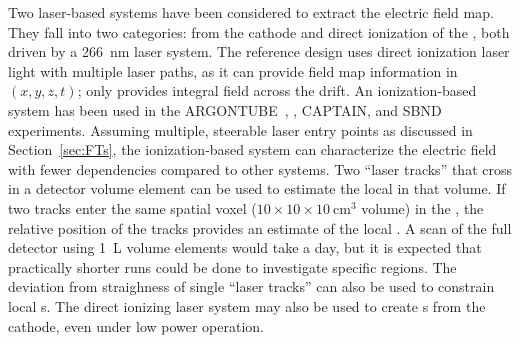 

Two laser-based systems have been considered to extract the electric field map. They fall into two categories: \phel from the \lartpc cathode and direct ionization of the , both driven by a \SI{266}{\nano\m} laser system. The reference design uses direct ionization laser light  with multiple laser paths, as it can provide field map information in $(x, y, z, t)$; \phel only provides integral field across the drift. An ionization-based system has been used in the ARGONTUBE~\cite{Zeller:2013sva}, , CAPTAIN, and SBND experiments. Assuming multiple, steerable laser entry points as discussed in Section~\ref{sec:FTs}, the ionization-based system can characterize the electric field with fewer dependencies compared to other systems. 
Two ``laser tracks'' that cross in a detector volume element can be used to estimate the local \efield in that volume. If two tracks enter the same spatial voxel 
($10 \times 10 \times 10~\textrm{cm}^3$ volume) in the , the relative position of the tracks provides an estimate of the local \threed \efield. A scan of the full detector using \SI{1}{L} volume elements would take a day, but it is expected that practically shorter runs could be done to investigate specific regions. 
The deviation from straighness of single ``laser tracks'' can also be used to constrain local \efield{}s. 
The direct ionizing laser system may also be used to create \phel{}s from the cathode, even under low power operation.

